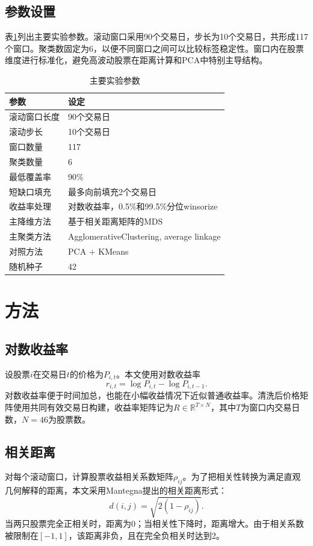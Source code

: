 \documentclass[UTF8,zihao=-4]{ctexart}
\begin{document}
\subsection{参数设置}
表\ref{tab:params}列出主要实验参数。滚动窗口采用90个交易日，步长为10个交易日，共形成117个窗口。聚类数固定为6，以便不同窗口之间可以比较标签稳定性。窗口内在股票维度进行标准化，避免高波动股票在距离计算和PCA中特别主导结构。

\begin{table}[H]
\centering
\caption{主要实验参数}
\label{tab:params}
\small
\begin{tabular}{ll}
\toprule
参数 & 设定 \\
\midrule
滚动窗口长度 & 90个交易日 \\
滚动步长 & 10个交易日 \\
窗口数量 & 117 \\
聚类数量 & 6 \\
最低覆盖率 & 90\% \\
短缺口填充 & 最多向前填充2个交易日 \\
收益率处理 & 对数收益率，0.5\%和99.5\%分位winsorize \\
主降维方法 & 基于相关距离矩阵的MDS \\
主聚类方法 & AgglomerativeClustering, average linkage \\
对照方法 & PCA + KMeans \\
随机种子 & 42 \\
\bottomrule
\end{tabular}
\end{table}

\section{方法}
\subsection{对数收益率}
设股票$i$在交易日$t$的价格为$P_{i,t}$。本文使用对数收益率
\begin{equation}
r_{i,t}=\log P_{i,t}-\log P_{i,t-1}.
\end{equation}
对数收益率便于时间加总，也能在小幅收益情况下近似普通收益率。清洗后价格矩阵使用共同有效交易日构建，收益率矩阵记为$R\in\mathbb{R}^{T\times N}$，其中$T$为窗口内交易日数，$N=46$为股票数。

\subsection{相关距离}
对每个滚动窗口，计算股票收益相关系数矩阵$\rho_{ij}$。为了把相关性转换为满足直观几何解释的距离，本文采用Mantegna提出的相关距离形式\cite{Mantegna1999}：
\begin{equation}
d(i,j)=\sqrt{2(1-\rho_{ij})}.
\end{equation}
当两只股票完全正相关时，距离为0；当相关性下降时，距离增大。由于相关系数被限制在$[-1,1]$，该距离非负，且在完全负相关时达到2。
\end{document}
